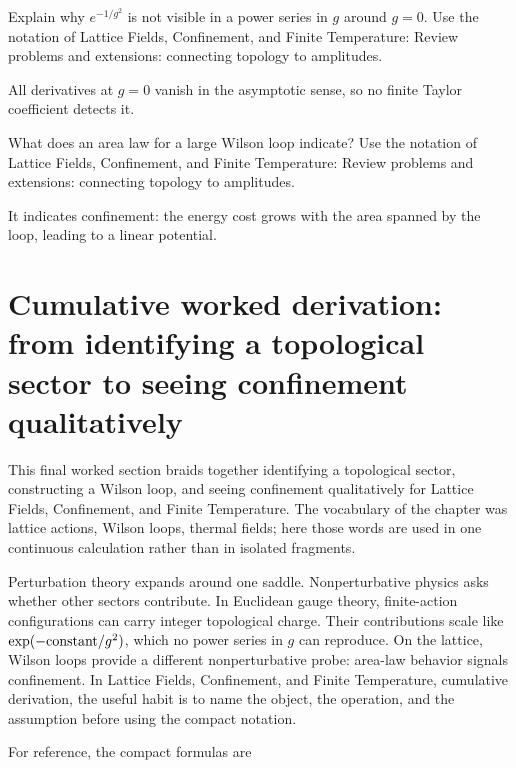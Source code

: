 \begin{exercise}
Explain why \(e^{-1/g^2}\) is not visible in a power series in \(g\) around \(g=0\).  Use the notation of Lattice Fields, Confinement, and Finite Temperature: Review problems and extensions: connecting topology to amplitudes.
\begin{answer}
All derivatives at \(g=0\) vanish in the asymptotic sense, so no finite Taylor coefficient detects it.
\end{answer}
\end{exercise}

\begin{exercise}
What does an area law for a large Wilson loop indicate?  Use the notation of Lattice Fields, Confinement, and Finite Temperature: Review problems and extensions: connecting topology to amplitudes.
\begin{answer}
It indicates confinement: the energy cost grows with the area spanned by the loop, leading to a linear potential.
\end{answer}
\end{exercise}



\section{Cumulative worked derivation: from identifying a topological sector to seeing confinement qualitatively}

This final worked section braids together identifying a topological sector, constructing a Wilson loop, and seeing confinement qualitatively for Lattice Fields, Confinement, and Finite Temperature.  The vocabulary of the chapter was lattice actions, Wilson loops, thermal fields; here those words are used in one continuous calculation rather than in isolated fragments.

Perturbation theory expands around one saddle.  Nonperturbative physics asks whether other sectors contribute.  In Euclidean gauge theory, finite-action configurations can carry integer topological charge.  Their contributions scale like \(\exp(-\hbox{constant}/g^2)\), which no power series in \(g\) can reproduce.  On the lattice, Wilson loops provide a different nonperturbative probe: area-law behavior signals confinement.  In Lattice Fields, Confinement, and Finite Temperature, cumulative derivation, the useful habit is to name the object, the operation, and the assumption before using the compact notation.

For reference, the compact formulas are

